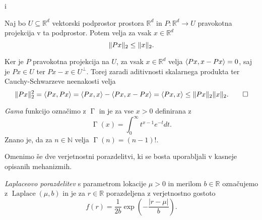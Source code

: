 i\documentclass[mat1]{fmfdelo}
\DeclarePairedDelimiter{\norm}{\lVert}{\rVert}
\DeclarePairedDelimiter{\scalar}{\langle}{\rangle}
\newcommand{\R}{\mathbb R}
\newcommand{\N}{\mathbb N}
\DeclareMathOperator{\gfn}{\Gamma}
\begin{document}
\begin{lema}
    Naj bo $U \subseteq \R^d$ vektorski podprostor prostora $\R^d$ in $P: \R^d \to U$ pravokotna projekcija v ta podprostor. Potem velja za vsak $x \in \R^d$
    \begin{equation*}
        \norm{Px}_2 \leq \norm{x}_2.
    \end{equation*}
\end{lema} 
\begin{dokaz}
    Ker je $P$ pravokotna projekcija na $U$, za vsak $x \in \R^d$ velja $\scalar{Px, x - Px}=0$, saj je $Px \in U$ ter $Px - x \in U^\bot$. Torej zaradi aditivnosti skalarnega produkta ter Cauchy-Schwarzeve neenakosti velja
    \begin{equation*}
        \norm{Px}_2^2 = \scalar{Px, Px} = \scalar{Px, x} - \scalar{Px, x - Px} = \scalar{Px, x} \leq \norm{Px}_2 \norm{x}_2. \qedhere
    \end{equation*}
\end{dokaz}

\begin{definicija}
{\em Gama} funkcijo označimo z $\gfn$ in je za vse $x > 0$ definirana z
\begin{equation*}
    \gfn(x)=\int_0^\infty t^{x-1}e^{-t}dt.
\end{equation*}
Znano je, da za $n \in \N$ velja $\gfn(n)=(n-1)!$.
\end{definicija}

Omenimo še dve verjetnostni porazdelitvi, ki se bosta uporabljali v kasneje opisanih mehanizmih. \\

\begin{definicija}
{\em Laplaceovo porazdelitev} s parametrom lokacije $\mu > 0$ in merilom $b \in \R$ označujemo z $\operatorname{Laplace}(\mu, b)$ in je za $r \in \R$ porazdeljena z verjetnostno gostoto
\begin{equation*}
    f(r) = \frac {1}{2b} \exp \left(-{\frac {|r-\mu |}{b}}\right).
\end{equation*}
\end{definicija}
\end{document}
